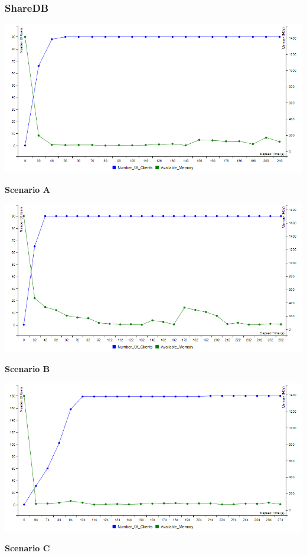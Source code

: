 \documentclass[12pt]{article}
\begin{document}
  \subsubsection{ShareDB}
  \begin{center}
    \includegraphics[scale=0.48]{sharedb_users_S1.png}

    \textbf{Scenario A}
    
    \includegraphics[scale=0.48]{sharedb_users_S2.png}
    
    \textbf{Scenario B}
    
    \includegraphics[scale=0.48]{sharedb_users_S3.png}
    
    \textbf{Scenario C}

  \end{center}
\end{document}
